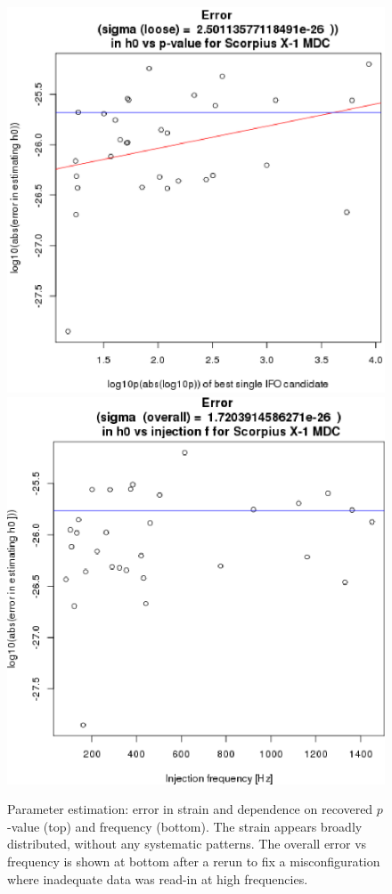 \begin{figure}
\begin{center}
\includegraphics[width=0.5\paperwidth,height=0.35\paperheight]{Errorh0.eps}
\includegraphics[width=0.5\paperwidth,height=0.35\paperheight]{plots/Errorh0vsF-overall.eps}
\caption{Parameter estimation: error in strain and dependence on recovered $p$-value (top) and frequency (bottom). The strain appears broadly distributed, without any systematic patterns. The overall error vs frequency is shown at bottom after a rerun to fix a misconfiguration where inadequate data was read-in at high frequencies.
\label{fig:errorh0}}
\end{center}
\end{figure}


